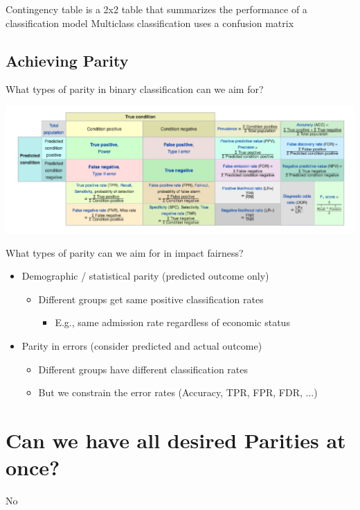\documentclass[11pt]{article}
\theoremstyle{definition}
\begin{document}
Contingency table is a 2x2 table that summarizes the performance of a classification model
Multiclass classification uses a confusion matrix

\subsection{Achieving Parity}
What types of parity in binary classification can we aim for?

\includegraphics[width=\textwidth]{3.png}

What types of parity can we aim for in impact fairness?
\begin{itemize}
    \item Demographic / statistical parity (predicted outcome only)
    \begin{itemize}
        \item Different groups get same positive classification rates
        \begin{itemize}
            \item E.g., same admission rate regardless of economic status
        \end{itemize}
    \end{itemize}
    \item Parity in errors (consider predicted and actual outcome)
    \begin{itemize}
        \item Different groups have different classification rates
        \item But we constrain the error rates (Accuracy, TPR, FPR, FDR, ...)
    \end{itemize}
\end{itemize}

\section{Can we have all desired Parities at once?}
No
\end{document}
